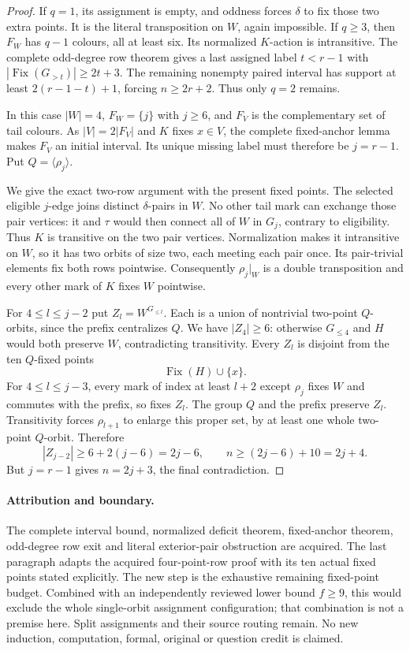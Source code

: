 \documentclass[11pt,a4paper]{article}
\newcommand{\gen}[1]{\langle#1\rangle}
\begin{document}
\begin{proof}
If $q=1$, its assignment is empty, and oddness forces
$\delta$ to fix those two extra points. It is the
literal transposition on $W$, again impossible.
If $q\ge3$, then $F_W$ has $q-1$ colours, all at
least six. Its normalized $K$-action is intransitive.
The complete odd-degree row theorem gives a last
assigned label $t<r-1$ with
$|\operatorname{Fix}(G_{>t})|\ge2t+3$.
The remaining nonempty paired interval has support
at least $2(r-1-t)+1$, forcing $n\ge2r+2$.
Thus only $q=2$ remains.

In this case $|W|=4$, $F_W=\{j\}$ with $j\ge6$,
and $F_V$ is the complementary set of tail colours.
As $|V|=2|F_V|$ and $K$ fixes $x\in V$, the
complete fixed-anchor lemma makes $F_V$ an initial
interval. Its unique missing label must therefore
be $j=r-1$. Put $Q=\gen{\rho_j}$.

We give the exact two-row argument with the present
fixed points. The selected eligible $j$-edge joins
distinct $\delta$-pairs in $W$. No other tail mark
can exchange those pair vertices: it and $\tau$
would then connect all of $W$ in $G_j$, contrary
to eligibility. Thus $K$ is transitive on the two
pair vertices. Normalization makes it intransitive
on $W$, so it has two orbits of size two, each
meeting each pair once. Its pair-trivial elements
fix both rows pointwise. Consequently $\rho_j|_W$
is a double transposition and every other mark
of $K$ fixes $W$ pointwise.

For $4\le l\le j-2$ put $Z_l=W^{G_{\le l}}$.
Each is a union of nontrivial two-point $Q$-orbits,
since the prefix centralizes $Q$. We have $|Z_4|\ge6$:
otherwise $G_{\le4}$ and $H$ would both preserve $W$,
contradicting transitivity. Every $Z_l$ is disjoint
from the ten $Q$-fixed points
\[
                         \operatorname{Fix}(H)\cup\{x\}.
\]
For $4\le l\le j-3$, every mark of index at least
$l+2$ except $\rho_j$ fixes $W$ and commutes with
the prefix, so fixes $Z_l$. The group $Q$ and the
prefix preserve $Z_l$. Transitivity forces
$\rho_{l+1}$ to enlarge this proper set, by at
least one whole two-point $Q$-orbit. Therefore
\[
        |Z_{j-2}|\ge6+2(j-6)=2j-6,
        \qquad n\ge(2j-6)+10=2j+4.
\]
But $j=r-1$ gives $n=2j+3$, the final contradiction.
\end{proof}

\paragraph{Attribution and boundary.}
The complete interval bound, normalized deficit theorem,
fixed-anchor theorem, odd-degree row exit and literal
exterior-pair obstruction are acquired. The last paragraph
adapts the acquired four-point-row proof with its ten
actual fixed points stated explicitly. The new step is
the exhaustive remaining fixed-point budget. Combined
with an independently reviewed lower bound $f\ge9$,
this would exclude the whole single-orbit assignment
configuration; that combination is not a premise here.
Split assignments and their source routing remain.
No new induction, computation, formal, original or
question credit is claimed.
\end{document}
